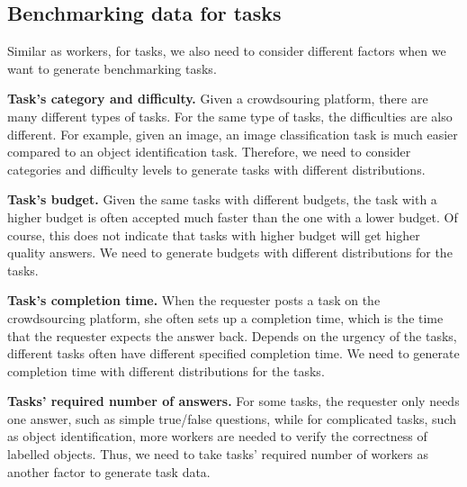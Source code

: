 \subsection{Benchmarking data for tasks}

Similar as workers, for tasks, we also need to consider different factors when we want to generate benchmarking tasks.

\textbf{Task's category and difficulty. } Given a crowdsouring platform, there are many different types of tasks. For the same type of tasks, the difficulties are also different. For example, given an image, an image classification task is much easier compared to an object identification task.  Therefore, we need to consider categories and difficulty levels to generate tasks with different distributions.

\textbf{Task's budget. }  Given the same tasks with different budgets,  the task with a higher budget is often accepted much faster than the one with a lower budget. Of course, this does not indicate that tasks with higher budget will get higher quality answers.  We need to generate budgets with different distributions for the tasks.

\textbf{Task's completion time. } When the requester posts a task on the crowdsourcing platform, she often sets up a completion time, which is the time that the requester expects the answer back. Depends on the urgency of the tasks,  different tasks often have different specified completion time. We need to generate completion time with different distributions for the tasks.

\textbf{Tasks' required number of answers. } For some tasks, the requester only needs one answer, such as simple true/false questions, while for complicated tasks, such as object identification, more workers are needed to verify the correctness of labelled objects.  Thus, we need to take tasks' required number of workers as another factor to generate task data.
